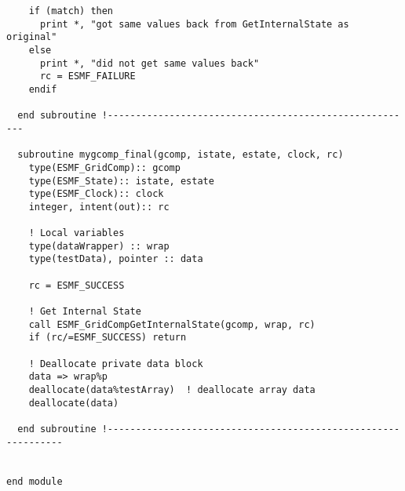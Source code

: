 \begin{verbatim}
    if (match) then
      print *, "got same values back from GetInternalState as original"
    else
      print *, "did not get same values back"
      rc = ESMF_FAILURE
    endif
    
  end subroutine !-------------------------------------------------------

  subroutine mygcomp_final(gcomp, istate, estate, clock, rc)
    type(ESMF_GridComp):: gcomp
    type(ESMF_State):: istate, estate
    type(ESMF_Clock):: clock
    integer, intent(out):: rc

    ! Local variables
    type(dataWrapper) :: wrap
    type(testData), pointer :: data

    rc = ESMF_SUCCESS
    
    ! Get Internal State
    call ESMF_GridCompGetInternalState(gcomp, wrap, rc)
    if (rc/=ESMF_SUCCESS) return
    
    ! Deallocate private data block
    data => wrap%p 
    deallocate(data%testArray)  ! deallocate array data
    deallocate(data)
    
  end subroutine !--------------------------------------------------------------


end module

 
\end{verbatim}

\setlength{\parskip}{\oldparskip}
\setlength{\parindent}{\oldparindent}
\setlength{\baselineskip}{\oldbaselineskip}
